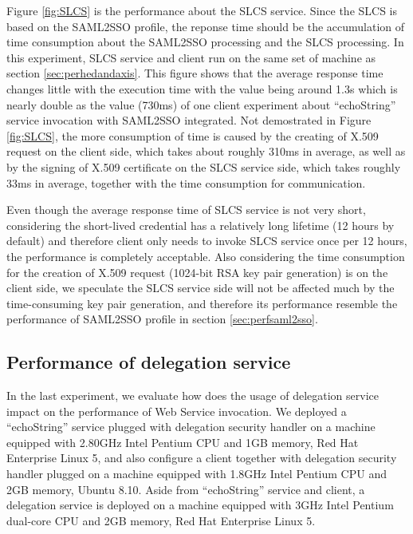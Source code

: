 \documentclass[conference]{IEEEtran}
\begin{document}
Figure \ref{fig:SLCS} is the performance about the SLCS service. Since the SLCS is based on the SAML2SSO
profile, the reponse time should be the accumulation of time consumption about the SAML2SSO processing 
and the SLCS processing. In this experiment, SLCS service and client run on the same set of machine 
as section \ref{sec:perhedandaxis}. This figure shows that the average response time changes little with
the execution time with the value being around 1.3s which is nearly double as the value (730ms) of one client 
experiment about ``echoString'' service invocation with SAML2SSO integrated. Not demostrated in 
Figure \ref{fig:SLCS}, the more consumption of time is caused by the creating of X.509 request on the
 client side, which takes about roughly 310ms in average, as well as by the signing of X.509 certificate 
on the SLCS service side, which takes roughly 33ms in average, together with the time consumption for 
communication.

Even though the average response time of SLCS service is not very short, considering the short-lived 
credential has a relatively long lifetime (12 hours by default) and therefore client only needs to invoke
SLCS service once per 12 hours, the performance is completely acceptable. Also considering the time 
consumption for the creation of X.509 request (1024-bit RSA key pair generation) is on the client side,
we speculate the SLCS service side will not be affected much by the time-consuming key pair generation, and
therefore its performance resemble the performance of SAML2SSO profile in section \ref{sec:perfsaml2sso}.

\subsection{Performance of delegation service}
\label{sec:perfdelegserv}

In the last experiment, we evaluate how does the usage of delegation service impact on the 
performance of Web Service invocation. We deployed a ``echoString'' service plugged with delegation
security handler on a machine equipped with 2.80GHz Intel Pentium CPU and 1GB memory, Red Hat 
Enterprise Linux 5, and also configure a client together with delegation security handler plugged 
on a machine equipped with 1.8GHz Intel Pentium CPU and 2GB memory, Ubuntu 8.10. Aside from 
``echoString'' service and client, a delegation service is deployed on a machine equipped with 
3GHz Intel Pentium dual-core CPU and 2GB memory, Red Hat Enterprise Linux 5.
\end{document}
